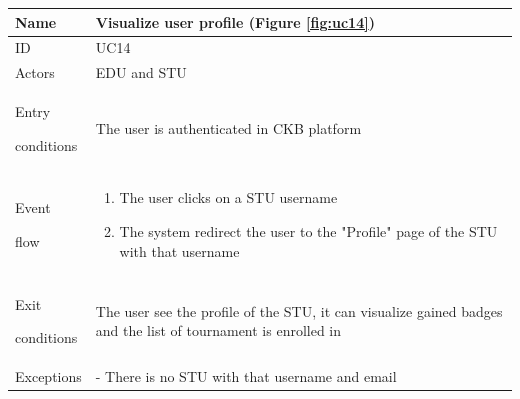 \begin{center}
    \def\arraystretch{1.5}
    \begin{tabular}{| m{2cm} | m{10cm}|}
        \hline
        Name                  & Visualize user profile  (Figure \ref{fig:uc14}) \\ \hline
        ID                    & UC14                                            \\ \hline
        Actors                & EDU and STU                                             \\ \hline
        Entry \par conditions & The user is authenticated in CKB platform                                             \\ \hline
        Event \par flow       & \begin{enumerate}
                                    \item The user clicks on a STU username
                                    \item The system redirect the user to the "Profile" page of the STU with that username
                                \end{enumerate}                                \\ \hline
        Exit \par conditions  & The user see the profile of the STU, it can visualize gained badges and the list of tournament is enrolled in                                             \\ \hline
        Exceptions            & - There is no STU with that username and email                                 \\ \hline
    \end{tabular}
\end{center}

